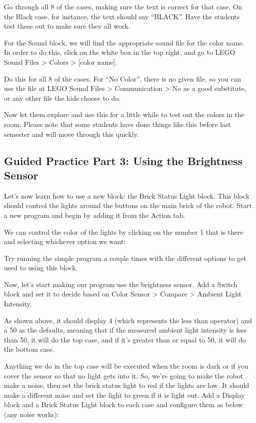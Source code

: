 \documentclass{lessonplan}
\begin{document}
        
        Go through all 8 of the cases, making sure the text is correct for that case. On the Black case, for instance, the text should say “BLACK”. Have the students test these out to make sure they all work.
        \par
        For the Sound block, we will find the appropriate sound file for the color name. In order to do this, click on the white box in the top right, and go to LEGO Sound Files > Colors > [color name]. 
        
        
        Do this for all 8 of the cases. For “No Color”, there is no given file, so you can use the file at LEGO Sound Files > Communication > No as a good substitute, or any other file the kids choose to do. 
        \par
        Now let them explore and use this for a little while to test out the colors in the room. Please note that some students have done things like this before last semester and will move through this quickly.
    \subsection{Guided Practice Part 3: Using the Brightness Sensor}
        Let’s now learn how to use a new block: the Brick Status Light block. This block should control the lights around the buttons on the main brick of the robot. Start a new program and begin by adding it from the Action tab.


        We can control the color of the lights by clicking on the number 1 that is there and selecting whichever option we want: 


        Try running the simple program a couple times with the different options to get used to using this block. 
        \par
        Now, let’s start making our program use the brightness sensor. Add a Switch block and set it to decide based on Color Sensor > Compare > Ambient Light Intensity. 
 

        As shown above, it should display 4 (which represents the less than operator) and a 50 as the defaults, meaning that if the measured ambient light intensity is less than 50, it will do the top case, and if it’s greater than or equal to 50, it will do the bottom case.
        \par
        Anything we do in the top case will be executed when the room is dark or if you cover the sensor so that no light gets into it. So, we’re going to make the robot make a noise, then set the brick status light to red if the lights are low. It should make a different noise and set the light to green if it is light out. Add a Display block and a Brick Status Light block to each case and configure them as below (any noise works):
        
\end{document}
